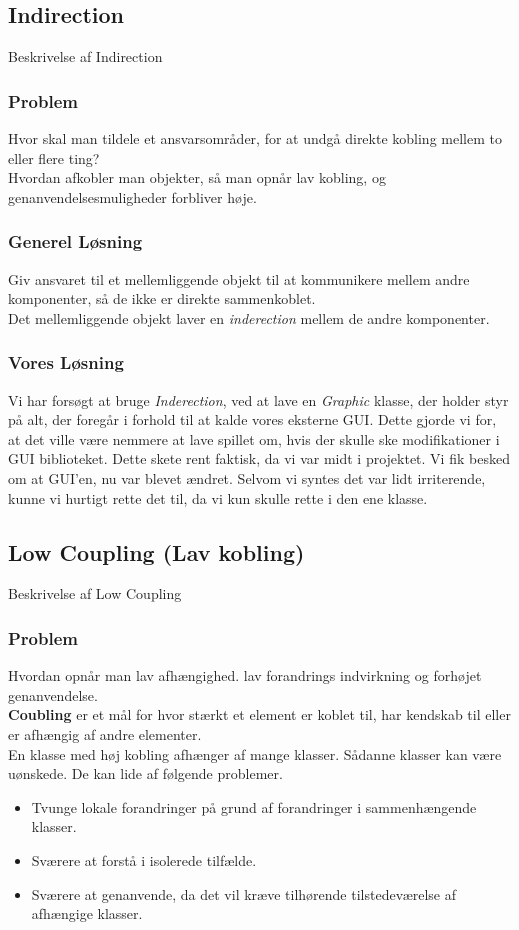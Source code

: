 \subsection{Indirection}
Beskrivelse af Indirection
\subsubsection{Problem}
Hvor skal man tildele et ansvarsområder, for at undgå direkte kobling mellem to eller flere ting?
\\
Hvordan afkobler man objekter, så man opnår lav kobling, og genanvendelsesmuligheder forbliver høje.
\subsubsection{Generel Løsning}
Giv ansvaret til et mellemliggende objekt til at kommunikere mellem andre komponenter, så de ikke er direkte sammenkoblet.
\\
Det mellemliggende objekt laver en \textit{inderection} mellem de andre komponenter.
\subsubsection{Vores Løsning}
Vi har forsøgt at bruge \textit{Inderection}, ved at lave en \textit{Graphic} klasse, der holder styr på alt, der foregår i forhold til at kalde vores eksterne GUI. Dette gjorde vi for, at det ville være nemmere at lave spillet om, hvis der skulle ske modifikationer i GUI biblioteket. Dette skete rent faktisk, da vi var midt i projektet. Vi fik besked om at GUI'en, nu var blevet ændret. Selvom vi syntes det var lidt irriterende, kunne vi hurtigt rette det til, da vi kun skulle rette i den ene klasse.
\subsection{Low Coupling (Lav kobling)}
Beskrivelse af Low Coupling
\subsubsection{Problem}
Hvordan opnår man lav afhængighed. lav forandrings indvirkning og forhøjet genanvendelse.
\\
\textbf{Coubling} er et mål for hvor stærkt et element er koblet til, har kendskab til eller er afhængig af andre elementer.
\\
En klasse med høj kobling afhænger af mange klasser. Sådanne klasser kan være uønskede. De kan lide af følgende problemer.
\begin{itemize}
\item Tvunge lokale forandringer på grund af forandringer i sammenhængende klasser.
\item Sværere at forstå i isolerede tilfælde.
\item Sværere at genanvende, da det vil kræve tilhørende tilstedeværelse af afhængige klasser.
\end{itemize}
